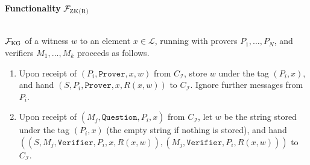 \documentclass[a4paper]{article}
\newcommand{\F}{\mathcal{F}}
\begin{document}
\begin{framed}
    \centerline{\textbf{Functionality} $\F_{\textsc{ZK(R)}}$}
    \ \\
    \noindent $\F_{\textsc{KG}}$ of a witness $w$ to an element $x \in \mathcal{L}$, running with provers $P_1, \ldots, P_N$, and verifiers $M_1, \ldots, M_k$ proceeds as follows.
    
    \begin{enumerate}
        \item Upon receipt of $(P_i, \texttt{Prover}, x, w)$ from $C_\mathcal{I}$, store $w$ under the tag $(P_i, x)$, and hand $(S, P_i, \texttt{Prover}, x, R(x, w))$ to $C_\mathcal{I}$. Ignore further messages from $P_i$.
        \item Upon receipt of $(M_j, \texttt{Question}, P_i, x)$ from $C_\mathcal{I}$, let $w$ be the string stored under the tag $(P_i, x)$ (the empty string if nothing is stored), and hand $((S, M_j, \texttt{Verifier}, P_i, x, R(x, w)), (M_j, \texttt{Verifier}, P_i, R(x, w)))$ to $C_\mathcal{I}$.
    \end{enumerate}
\end{framed}





\end{document}
